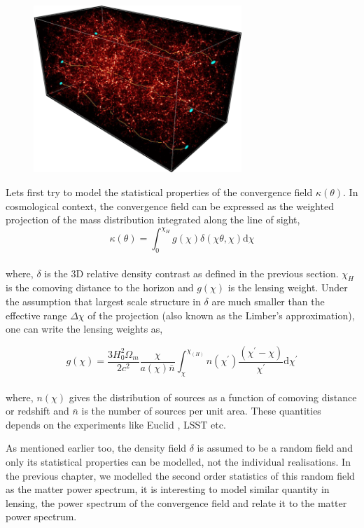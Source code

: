 \begin{figure}
	\centering
	\includegraphics[width=0.7\textwidth]{figures/weaklensing.png}
	\caption{}
	\label{fig:wl}
\end{figure}

Lets first try to model the statistical properties of the convergence field
$\kappa(\theta)$. In cosmological context, the convergence field can be expressed
as the weighted projection of the mass distribution integrated along the line of 
sight,
\begin{equation}
	\kappa(\theta) = \int_0^{\chi_H} g(\chi)\delta(\chi\theta,\chi) \mathrm{d}\chi
\end{equation}
\\
where, $\delta$ is the 3D relative density contrast as defined in the previous section.
$\chi_H$ is the comoving distance to the horizon and $g(\chi)$ is the lensing 
weight. Under the assumption that largest scale structure in $\delta$ are much smaller
than the effective range $\Delta \chi$ of the projection (also known as the Limber's 
approximation), one can write the lensing weights as,

\begin{equation}
	g(\chi) = \dfrac{3H_0^2\Omega_m}{2c^2} \dfrac{\chi}{a(\chi)\bar{n}} \int_{\chi}^{\chi_(H)}
					n(\chi^{\prime})
					\dfrac{(\chi^{\prime}-\chi)}{\chi^{\prime}}\mathrm{d}\chi^{\prime}
\end{equation}
\\
where, $n(\chi)$ gives the distribution of sources as a function of comoving distance or redshift
and $\bar{n}$ is the number of sources per unit area. These quantities depends on the
experiments like Euclid \cite{2013LRR....16....6A}, LSST \cite{2009arXiv0912.0201L} etc.

As mentioned earlier too, the density field $\delta$ is assumed to be a random field
and only its statistical properties can be modelled, not the individual realisations. 
In the previous chapter, we modelled the second order statistics of this random field
as the matter power spectrum, it is interesting to model similar quantity in lensing,
the power spectrum of the convergence field and relate it to the matter power spectrum.


